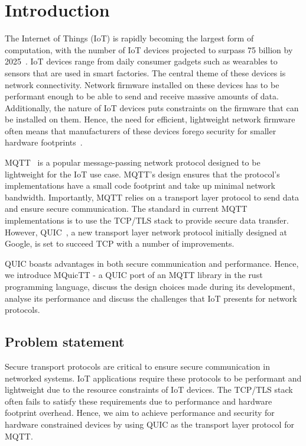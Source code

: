 \chapter{Introduction}


The Internet of Things (IoT) is rapidly becoming the largest form of computation, with the number of IoT devices projected to surpass 75 billion by 2025~\citep{statista_number_2016}.
IoT devices range from daily consumer gadgets such as wearables to sensors that are used in smart factories.
The central theme of these devices is network connectivity.
Network firmware installed on these devices has to be performant enough to be able to send and receive massive amounts of data. 
Additionally, the nature of IoT devices puts constraints on the firmware that can be installed on them.
Hence, the need for efficient, lightweight network firmware often means that manufacturers of these devices forego security for smaller hardware footprints~\cite{ling_iot_2018}.

MQTT~\citep{oasis_mqtt_2014} is a popular message-passing network protocol designed to be lightweight for the IoT use case.
MQTT's design ensures that the protocol's implementations have a small code footprint and take up minimal network bandwidth.
Importantly, MQTT relies on a transport layer protocol to send data and ensure secure communication.
The standard in current MQTT implementations is to use the TCP/TLS stack to provide secure data transfer.
However, QUIC~\citep{iyengar_quic_2021}, a new transport layer network protocol initially designed at Google, is set to succeed TCP with a number of improvements.

QUIC boasts advantages in both secure communication and performance.
Hence, we introduce MQuicTT - a QUIC port of an MQTT library in the rust programming language, discuss the design choices made during its development, analyse its performance and discuss the challenges that IoT presents for network protocols.

\section{Problem statement}

Secure transport protocols are critical to ensure secure communication in networked systems.
IoT applications require these protocols to be performant and lightweight due to the resource constraints of IoT devices.
The TCP/TLS stack often fails to satisfy these requirements due to performance and hardware footprint overhead.
Hence, we aim to achieve performance and security for hardware constrained devices by using QUIC as the transport layer protocol for MQTT.


